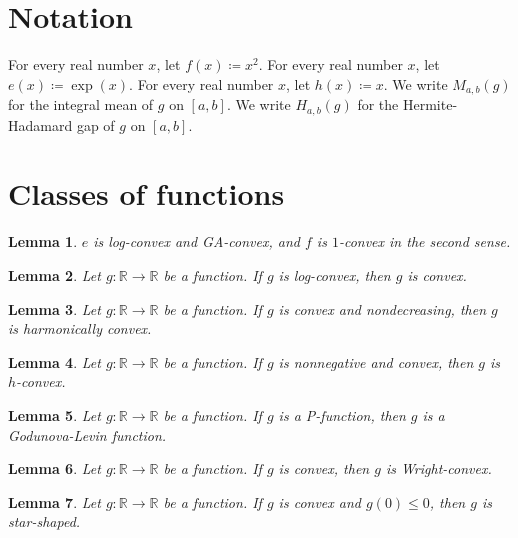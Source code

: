 \documentclass{article}
\newtheorem{lemma}{Lemma}
\begin{document}
\section{Notation}

For every real number $x$, let $f(x)\coloneqq x^2$.
For every real number $x$, let $e(x)\coloneqq\exp(x)$.
For every real number $x$, let $h(x)\coloneqq x$.
We write $M_{a,b}(g)$ for the integral mean of $g$ on $[a,b]$.
We write $H_{a,b}(g)$ for the Hermite-Hadamard gap of $g$ on $[a,b]$.

\section{Classes of functions}

\begin{lemma}\label{exponential}
$e$ is log-convex and GA-convex, and $f$ is $1$-convex in the second sense.
\end{lemma}

\begin{lemma}\label{logconvex}
Let $g:\mathbb{R}\to\mathbb{R}$ be a function. If $g$ is log-convex, then $g$ is convex.
\end{lemma}

\begin{lemma}\label{harmonic}
Let $g:\mathbb{R}\to\mathbb{R}$ be a function. If $g$ is convex and nondecreasing, then $g$ is harmonically convex.
\end{lemma}

\begin{lemma}\label{hconvex}
Let $g:\mathbb{R}\to\mathbb{R}$ be a function. If $g$ is nonnegative and convex, then $g$ is $h$-convex.
\end{lemma}

\begin{lemma}\label{pfunction}
Let $g:\mathbb{R}\to\mathbb{R}$ be a function. If $g$ is a P-function, then $g$ is a Godunova-Levin function.
\end{lemma}

\begin{lemma}\label{wright}
Let $g:\mathbb{R}\to\mathbb{R}$ be a function. If $g$ is convex, then $g$ is Wright-convex.
\end{lemma}

\begin{lemma}\label{starshaped}
Let $g:\mathbb{R}\to\mathbb{R}$ be a function. If $g$ is convex and $g(0)\le0$, then $g$ is star-shaped.
\end{lemma}
\end{document}
